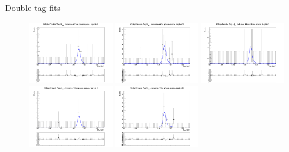 \documentclass{beamer}
\begin{document}
\begin{frame}{Double tag fits}
  \begin{figure}
    \centering
    \includegraphics[width=0.32\textwidth, clip = true, trim = {0 11cm 0 0}]{Plots/DoubleTagYield_DoubleTag_SCMB_KKpipi_vs_KSpipi_SignalBin0_TagBin1.png}
    \includegraphics[width=0.32\textwidth, clip = true, trim = {0 11cm 0 0}]{Plots/DoubleTagYield_DoubleTag_SCMB_KKpipi_vs_KSpipi_SignalBin0_TagBin2.png}
    \includegraphics[width=0.32\textwidth, clip = true, trim = {0 11cm 0 0}]{Plots/DoubleTagYield_DoubleTag_SCMB_KKpipi_vs_KSpipi_SignalBin0_TagBin3.png}
    \includegraphics[width=0.32\textwidth, clip = true, trim = {0 11cm 0 0}]{Plots/DoubleTagYield_DoubleTag_SCMB_KKpipi_vs_KSpipi_SignalBin0_TagBin4.png}
    \includegraphics[width=0.32\textwidth, clip = true, trim = {0 11cm 0 0}]{Plots/DoubleTagYield_DoubleTag_SCMB_KKpipi_vs_KSpipi_SignalBin0_TagBin5.png}

\end{figure}
\end{frame}
\end{document}
